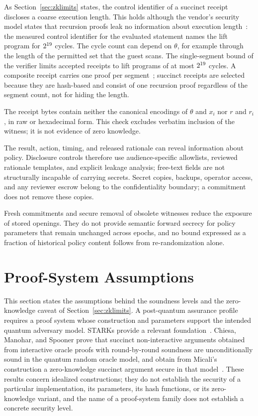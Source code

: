 As Section~\ref{sec:zklimits} states, the control identifier of a succinct receipt discloses a coarse execution length. This holds although the vendor's security model states that recursion proofs leak no information about execution length~\cite{risc0sec}: the measured control identifier for the evaluated statement names the lift program for $2^{19}$ cycles. The cycle count can depend on $\theta$, for example through the length of the permitted set that the guest scans. The single-segment bound of the verifier limits accepted receipts to lift programs of at most $2^{19}$ cycles. A composite receipt carries one proof per segment~\cite{risc0}; succinct receipts are selected because they are hash-based and consist of one recursion proof regardless of the segment count, not for hiding the length.

The receipt bytes contain neither the canonical encodings of $\theta$ and $x_i$ nor $r$ and $r_i$, in raw or hexadecimal form. This check excludes verbatim inclusion of the witness; it is not evidence of zero knowledge.

The result, action, timing, and released rationale can reveal information about policy. Disclosure controls therefore use audience-specific allowlists, reviewed rationale templates, and explicit leakage analysis; free-text fields are not structurally incapable of carrying secrets. Secret copies, backups, operator access, and any reviewer escrow belong to the confidentiality boundary; a commitment does not remove these copies.

Fresh commitments and secure removal of obsolete witnesses reduce the exposure of stored openings. They do not provide semantic forward secrecy for policy parameters that remain unchanged across epochs, and no bound expressed as a fraction of historical policy content follows from re-randomization alone.

\section{Proof-System Assumptions}
\label{s:zkpq}
This section states the assumptions behind the soundness levels and the zero-knowledge caveat of Section~\ref{sec:zklimits}. A post-quantum assurance profile requires a proof system whose construction and parameters support the intended quantum adversary model. STARKs provide a relevant foundation~\cite{stark}. Chiesa, Manohar, and Spooner prove that succinct non-interactive arguments obtained from interactive oracle proofs with round-by-round soundness are unconditionally sound in the quantum random oracle model, and obtain from Micali's construction a zero-knowledge succinct argument secure in that model~\cite{cms}. These results concern idealized constructions; they do not establish the security of a particular implementation, its parameters, its hash functions, or its zero-knowledge variant, and the name of a proof-system family does not establish a concrete security level.

